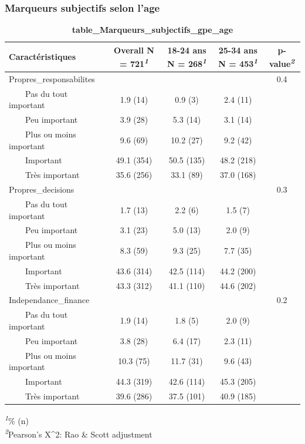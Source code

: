 \documentclass[
]{article}
\begin{document}
\hypertarget{marqueurs-subjectifs-selon-lage}{%
\subsubsection{Marqueurs subjectifs selon
l'age}\label{marqueurs-subjectifs-selon-lage}}

\begin{table}[!t]
\caption{\label{tab:unnamed-chunk-81}\textbf{table\_Marqueurs\_subjectifs\_gpe\_age}} 
\fontsize{12.0pt}{14.4pt}\selectfont
\begin{tabular*}{\linewidth}{@{\extracolsep{\fill}}lcccc}
\toprule
\textbf{Caractéristiques} & \textbf{Overall}  N = 721\textsuperscript{\textit{1}} & \textbf{18-24 ans}  N = 268\textsuperscript{\textit{1}} & \textbf{25-34 ans}  N = 453\textsuperscript{\textit{1}} & \textbf{p-value}\textsuperscript{\textit{2}} \\ 
\midrule\addlinespace[2.5pt]
Propres\_responsabilites &  &  &  & 0.4 \\ 
    Pas du tout important & 1.9 (14) & 0.9 (3) & 2.4 (11) &  \\ 
    Peu important & 3.9 (28) & 5.3 (14) & 3.1 (14) &  \\ 
    Plus ou moins important & 9.6 (69) & 10.2 (27) & 9.2 (42) &  \\ 
    Important & 49.1 (354) & 50.5 (135) & 48.2 (218) &  \\ 
    Très important & 35.6 (256) & 33.1 (89) & 37.0 (168) &  \\ 
Propres\_decisions &  &  &  & 0.3 \\ 
    Pas du tout important & 1.7 (13) & 2.2 (6) & 1.5 (7) &  \\ 
    Peu important & 3.1 (23) & 5.0 (13) & 2.0 (9) &  \\ 
    Plus ou moins important & 8.3 (59) & 9.3 (25) & 7.7 (35) &  \\ 
    Important & 43.6 (314) & 42.5 (114) & 44.2 (200) &  \\ 
    Très important & 43.3 (312) & 41.1 (110) & 44.6 (202) &  \\ 
Independance\_finance &  &  &  & 0.2 \\ 
    Pas du tout important & 1.9 (14) & 1.8 (5) & 2.0 (9) &  \\ 
    Peu important & 3.8 (28) & 6.4 (17) & 2.3 (11) &  \\ 
    Plus ou moins important & 10.3 (75) & 11.7 (31) & 9.6 (43) &  \\ 
    Important & 44.3 (319) & 42.6 (114) & 45.3 (205) &  \\ 
    Très important & 39.6 (286) & 37.5 (101) & 40.9 (185) &  \\ 
\bottomrule
\end{tabular*}
\begin{minipage}{\linewidth}
\textsuperscript{\textit{1}}\% (n)\\
\textsuperscript{\textit{2}}Pearson's X\^{}2: Rao \& Scott adjustment\\
\end{minipage}
\end{table}
\end{document}
